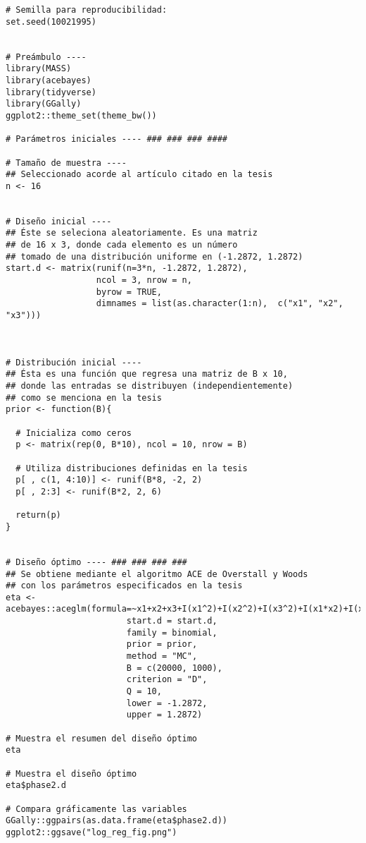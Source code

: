 \begin{lstlisting}[style=R, caption={Se muestra el código que implementa el algoritmo ACE de \cite{Woods_ACE} para replicar el ejemplo de regresión logística de \cite{Woods_etal} del Capítulo \ref{chapter:doe_para_glms}}, captionpos=b]
# Semilla para reproducibilidad:
set.seed(10021995)


# Preámbulo ----
library(MASS)
library(acebayes)
library(tidyverse)
library(GGally)
ggplot2::theme_set(theme_bw())

# Parámetros iniciales ---- ### ### ### ####

# Tamaño de muestra ----
## Seleccionado acorde al artículo citado en la tesis
n <- 16


# Diseño inicial ----
## Éste se seleciona aleatoriamente. Es una matriz
## de 16 x 3, donde cada elemento es un número
## tomado de una distribución uniforme en (-1.2872, 1.2872)
start.d <- matrix(runif(n=3*n, -1.2872, 1.2872),
                  ncol = 3, nrow = n,
                  byrow = TRUE, 
                  dimnames = list(as.character(1:n),  c("x1", "x2", "x3")))



# Distribución inicial ----
## Ésta es una función que regresa una matriz de B x 10,
## donde las entradas se distribuyen (independientemente)
## como se menciona en la tesis
prior <- function(B){
  
  # Inicializa como ceros
  p <- matrix(rep(0, B*10), ncol = 10, nrow = B)
  
  # Utiliza distribuciones definidas en la tesis
  p[ , c(1, 4:10)] <- runif(B*8, -2, 2)
  p[ , 2:3] <- runif(B*2, 2, 6)
  
  return(p)
}


# Diseño óptimo ---- ### ### ### ###
## Se obtiene mediante el algoritmo ACE de Overstall y Woods
## con los parámetros especificados en la tesis
eta <- acebayes::aceglm(formula=~x1+x2+x3+I(x1^2)+I(x2^2)+I(x3^2)+I(x1*x2)+I(x1*x3)+I(x2*x3),
                        start.d = start.d, 
                        family = binomial,
                        prior = prior,
                        method = "MC",
                        B = c(20000, 1000),
                        criterion = "D",
                        Q = 10,
                        lower = -1.2872,
                        upper = 1.2872)

# Muestra el resumen del diseño óptimo
eta

# Muestra el diseño óptimo
eta$phase2.d

# Compara gráficamente las variables
GGally::ggpairs(as.data.frame(eta$phase2.d))
ggplot2::ggsave("log_reg_fig.png")



\end{lstlisting}
